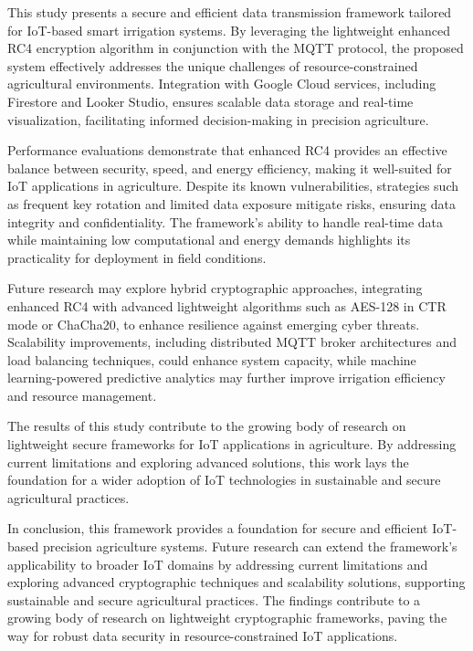 \documentclass[runningheads]{llncs}
\begin{document}
This study presents a secure and efficient data transmission framework tailored for IoT-based smart irrigation systems. By leveraging the lightweight enhanced RC4 encryption algorithm in conjunction with the MQTT protocol, the proposed system effectively addresses the unique challenges of resource-constrained agricultural environments. Integration with Google Cloud services, including Firestore and Looker Studio, ensures scalable data storage and real-time visualization, facilitating informed decision-making in precision agriculture.

Performance evaluations demonstrate that enhanced RC4 provides an effective balance between security, speed, and energy efficiency, making it well-suited for IoT applications in agriculture. Despite its known vulnerabilities, strategies such as frequent key rotation and limited data exposure mitigate risks, ensuring data integrity and confidentiality. The framework’s ability to handle real-time data while maintaining low computational and energy demands highlights its practicality for deployment in field conditions.

Future research may explore hybrid cryptographic approaches, integrating enhanced RC4 with advanced lightweight algorithms such as AES-128 in CTR mode or ChaCha20, to enhance resilience against emerging cyber threats. Scalability improvements, including distributed MQTT broker architectures and load balancing techniques, could enhance system capacity, while machine learning-powered predictive analytics may further improve irrigation efficiency and resource management.

The results of this study contribute to the growing body of research on lightweight secure frameworks for IoT applications in agriculture. By addressing current limitations and exploring advanced solutions, this work lays the foundation for a wider adoption of IoT technologies in sustainable and secure agricultural practices.

In conclusion, this framework provides a foundation for secure and efficient IoT-based precision agriculture systems. Future research can extend the framework's applicability to broader IoT domains by addressing current limitations and exploring advanced cryptographic techniques and scalability solutions, supporting sustainable and secure agricultural practices. The findings contribute to a growing body of research on lightweight cryptographic frameworks, paving the way for robust data security in resource-constrained IoT applications.
\end{document}
